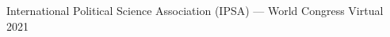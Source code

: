 \begin{cvhonors}
\cvconf
{International Political Science Association (IPSA) --- World Congress} 
{Virtual}
{2021}
\end{cvhonors}











